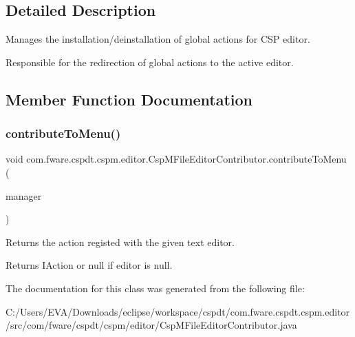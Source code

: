 \subsection{Detailed Description}
Manages the installation/deinstallation of global actions for C\+SP editor. 

Responsible for the redirection of global actions to the active editor. 

\subsection{Member Function Documentation}
\mbox{\label{classcom_1_1fware_1_1cspdt_1_1cspm_1_1editor_1_1_csp_m_file_editor_contributor_a174a9d21a0f5f59065241b20ea669fdf}} 
\subsubsection{\texorpdfstring{contribute\+To\+Menu()}{contributeToMenu()}}
{\footnotesize\ttfamily void com.\+fware.\+cspdt.\+cspm.\+editor.\+Csp\+M\+File\+Editor\+Contributor.\+contribute\+To\+Menu (\begin{DoxyParamCaption}\item[{I\+Menu\+Manager}]{manager }\end{DoxyParamCaption})\hspace{0.3cm}{\ttfamily [inline]}}



Returns the action registed with the given text editor. 

\begin{DoxyReturn}{Returns}
I\+Action or null if editor is null. 
\end{DoxyReturn}


The documentation for this class was generated from the following file\+:\begin{DoxyCompactItemize}
\item 
C\+:/\+Users/\+E\+V\+A/\+Downloads/eclipse/workspace/cspdt/com.\+fware.\+cspdt.\+cspm.\+editor/src/com/fware/cspdt/cspm/editor/Csp\+M\+File\+Editor\+Contributor.\+java\end{DoxyCompactItemize}
